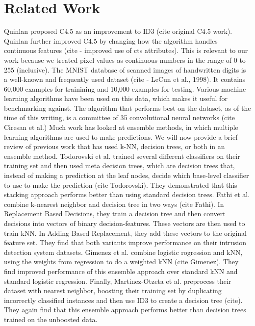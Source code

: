 \section{Related Work}
Quinlan proposed C4.5 as an improvement to ID3 (cite original C4.5 work). Quinlan further improved C4.5 by changing how the algorithm handles continuous features (cite - improved use of cts attributes). This is relevant to our work because we treated pixel values as continuous numbers in the range of 0 to 255 (inclusive). 
The MNIST database of scanned images of handwritten digits is a well-known and frequently used dataset (cite - LeCun et al., 1998). It contains 60,000 examples for trainining and 10,000 examples for testing. Various machine learning algorithms have been used on this data, which makes it useful for benchmarking against. The algorithm that performs best on the dataset, as of the time of this writing, is a committee of 35 convolutional neural networks (cite Ciresan et al.)
Much work has looked at ensemble methods, in which multiple learning algorithms are used to make predictions. We will now provide a brief review of previous work that has used k-NN, decision trees, or both in an ensemble method. Todorovski et al. trained several different classifiers on their training set and then used meta decision trees, which are decision trees that, instead of making a prediction at the leaf nodes, decide which base-level classifier to use to make the prediction (cite Todorovski). They demonstrated that this stacking approach performs better than using standard decision trees.
Fathi et al. combine k-nearest neighbor and decision tree in two ways (cite Fathi). In Replacement Based Decisions, they train a decision tree and then convert decisions into vectors of binary decision-features. These vectors are then used to train kNN. In Adding Based Replacement, they add these vectors to the original feature set. They find that both variants improve performance on their intrusion detection system datasets.
Gimenez et al. combine logistic rogression and kNN, using the weights from regression to do a weighted kNN (cite Gimenez). They find improved performance of this ensemble approach over standard kNN and standard logistic regression. Finally, Martinez-Otzeta et al. preprocess their dataset with nearest neighbor, boosting their training set by duplicating incorrectly classified instances and then use ID3 to create a decision tree (cite). They again find that this ensemble approach performs better than decision trees trained on the unboosted data. 

